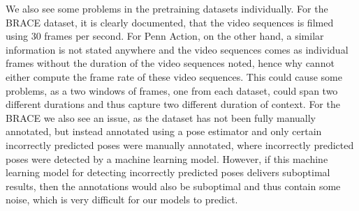 \documentclass[./main.tex]{subfiles}
\begin{document}
We also see some problems in the pretraining datasets individually. For the BRACE dataset, it is clearly documented, that the video sequences is filmed using 30 frames per second. For Penn Action, on the other hand, a similar information is not stated anywhere and the video sequences comes as individual frames without the duration of the video sequences noted, hence why cannot either compute the frame rate of these video sequences. This could cause some problems, as a two windows of frames, one from each dataset, could span two different durations and thus capture two different duration of context. For the BRACE we also see an issue, as the dataset has not been fully manually annotated, but instead annotated using a pose estimator and only certain incorrectly predicted poses were manually annotated, where incorrectly predicted poses were detected by a machine learning model. However, if this machine learning model for detecting incorrectly predicted poses delivers suboptimal results, then the annotations would also be suboptimal and thus contain some noise, which is very difficult for our models to predict.
\end{document}
